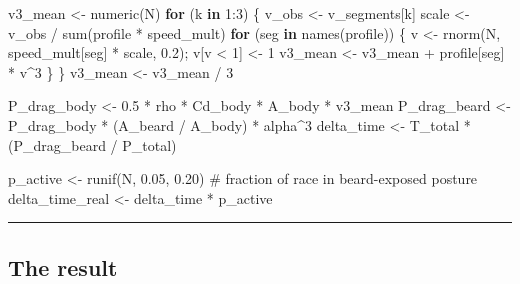 \documentclass[
  letterpaper,
  DIV=11,
  numbers=noendperiod]{scrartcl}
\newenvironment{Shaded}{\begin{snugshade}}{\end{snugshade}}
\newcommand{\CommentTok}[1]{\textcolor[rgb]{0.37,0.37,0.37}{#1}}
\newcommand{\ControlFlowTok}[1]{\textcolor[rgb]{0.00,0.23,0.31}{\textbf{#1}}}
\newcommand{\DecValTok}[1]{\textcolor[rgb]{0.68,0.00,0.00}{#1}}
\newcommand{\FloatTok}[1]{\textcolor[rgb]{0.68,0.00,0.00}{#1}}
\newcommand{\FunctionTok}[1]{\textcolor[rgb]{0.28,0.35,0.67}{#1}}
\newcommand{\NormalTok}[1]{\textcolor[rgb]{0.00,0.23,0.31}{#1}}
\newcommand{\OtherTok}[1]{\textcolor[rgb]{0.00,0.23,0.31}{#1}}
\newcommand{\SpecialCharTok}[1]{\textcolor[rgb]{0.37,0.37,0.37}{#1}}
\begin{document}
\begin{Shaded}
\begin{Highlighting}[]
\NormalTok{v3\_mean }\OtherTok{\textless{}{-}} \FunctionTok{numeric}\NormalTok{(N)}
\ControlFlowTok{for}\NormalTok{ (k }\ControlFlowTok{in} \DecValTok{1}\SpecialCharTok{:}\DecValTok{3}\NormalTok{) \{}
\NormalTok{  v\_obs }\OtherTok{\textless{}{-}}\NormalTok{ v\_segments[k]}
\NormalTok{  scale }\OtherTok{\textless{}{-}}\NormalTok{ v\_obs }\SpecialCharTok{/} \FunctionTok{sum}\NormalTok{(profile }\SpecialCharTok{*}\NormalTok{ speed\_mult)}
  \ControlFlowTok{for}\NormalTok{ (seg }\ControlFlowTok{in} \FunctionTok{names}\NormalTok{(profile)) \{}
\NormalTok{    v }\OtherTok{\textless{}{-}} \FunctionTok{rnorm}\NormalTok{(N, speed\_mult[seg] }\SpecialCharTok{*}\NormalTok{ scale, }\FloatTok{0.2}\NormalTok{);  v[v }\SpecialCharTok{\textless{}} \DecValTok{1}\NormalTok{] }\OtherTok{\textless{}{-}} \DecValTok{1}
\NormalTok{    v3\_mean }\OtherTok{\textless{}{-}}\NormalTok{ v3\_mean }\SpecialCharTok{+}\NormalTok{ profile[seg] }\SpecialCharTok{*}\NormalTok{ v}\SpecialCharTok{\^{}}\DecValTok{3}
\NormalTok{  \}}
\NormalTok{\}}
\NormalTok{v3\_mean }\OtherTok{\textless{}{-}}\NormalTok{ v3\_mean }\SpecialCharTok{/} \DecValTok{3}

\NormalTok{P\_drag\_body  }\OtherTok{\textless{}{-}} \FloatTok{0.5} \SpecialCharTok{*}\NormalTok{ rho }\SpecialCharTok{*}\NormalTok{ Cd\_body }\SpecialCharTok{*}\NormalTok{ A\_body }\SpecialCharTok{*}\NormalTok{ v3\_mean}
\NormalTok{P\_drag\_beard }\OtherTok{\textless{}{-}}\NormalTok{ P\_drag\_body }\SpecialCharTok{*}\NormalTok{ (A\_beard }\SpecialCharTok{/}\NormalTok{ A\_body) }\SpecialCharTok{*}\NormalTok{ alpha}\SpecialCharTok{\^{}}\DecValTok{3}
\NormalTok{delta\_time   }\OtherTok{\textless{}{-}}\NormalTok{ T\_total }\SpecialCharTok{*}\NormalTok{ (P\_drag\_beard }\SpecialCharTok{/}\NormalTok{ P\_total)}

\NormalTok{p\_active        }\OtherTok{\textless{}{-}} \FunctionTok{runif}\NormalTok{(N, }\FloatTok{0.05}\NormalTok{, }\FloatTok{0.20}\NormalTok{)   }\CommentTok{\# fraction of race in beard{-}exposed posture}
\NormalTok{delta\_time\_real }\OtherTok{\textless{}{-}}\NormalTok{ delta\_time }\SpecialCharTok{*}\NormalTok{ p\_active}
\end{Highlighting}
\end{Shaded}

\begin{center}\rule{0.5\linewidth}{0.5pt}\end{center}

\subsection{The result}\label{the-result}
\end{document}
